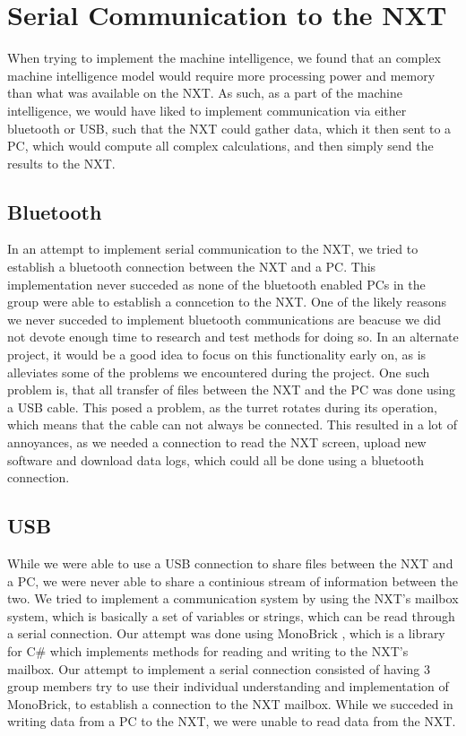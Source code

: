 \section{Serial Communication to the NXT}
When trying to implement the machine intelligence, we found that an complex
machine intelligence model would require more processing power and memory than
what was available on the NXT. As such, as a part of the machine intelligence,
we would have liked to implement communication via either bluetooth or USB, such
that the NXT could gather data, which it then sent to a PC, which would compute
all complex calculations, and then simply send the results to the NXT.

\subsection{Bluetooth}
In an attempt to implement serial communication to the NXT, we tried to
establish a bluetooth connection between the NXT and a PC. This implementation
never succeded as none of the bluetooth enabled PCs in the group were able to
establish a conncetion to the NXT.\nl
One of the likely reasons we never succeded to implement bluetooth
communications are beacuse we did not devote enough time to research and test
methods for doing so. In an alternate project, it would be a good idea to focus
on this functionality early on, as is alleviates some of the problems we
encountered during the project. One such problem is, that all transfer of files
between the NXT and the PC was done using a USB cable. This posed a problem, as
the turret rotates during its operation, which means that the cable can not
always be connected. This resulted in a lot of annoyances, as we needed a
connection to read the NXT screen, upload new software and download data logs,
which could all be done using a bluetooth connection.

\subsection{USB}
While we were able to use a USB connection to share files between the NXT and a
PC, we were never able to share a continious stream of information between the
two. We tried to implement a communication system by using the NXT's mailbox
system, which is basically a set of variables or strings, which can be read
through a serial connection. Our attempt was done using MonoBrick
\cite{MonoBrick}, which is a library for C\# which implements methods for
reading and writing to the NXT's mailbox. Our attempt to implement a serial
connection consisted of having 3 group members try to use their individual
understanding and implementation of MonoBrick, to establish a connection to the
NXT mailbox. While we succeded in writing data from a PC to the NXT, we were
unable to read data from the NXT.

